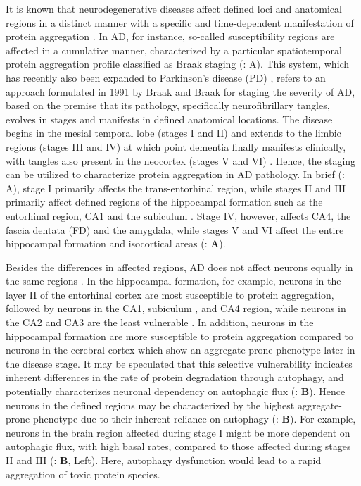 It is known that neurodegenerative diseases affect defined loci and anatomical regions in a distinct manner with a specific and time-dependent manifestation of protein aggregation \citep{Wang2010a,Wang2010b}. In AD, for instance, so-called susceptibility regions are affected in a cumulative manner, characterized by a particular spatiotemporal protein aggregation profile classified as Braak staging (: A). This system, which has recently also been expanded to Parkinson’s disease (PD) \citep{Braak2004}, refers to an approach formulated in 1991 by Braak and Braak for staging the severity of AD, based on the premise that its pathology, specifically neurofibrillary tangles, evolves in stages and manifests in defined anatomical locations. The disease begins in the mesial temporal lobe (stages I and II) and extends to the limbic regions (stages III and IV) at which point dementia finally manifests clinically, with tangles also present in the neocortex (stages V and VI) \citep{Braak1991}. Hence, the staging can be utilized to characterize protein aggregation in AD pathology. In brief (: A), stage I primarily affects the trans-entorhinal region, while stages II and III primarily affect defined regions of the hippocampal formation such as the entorhinal region, CA1 and the subiculum \citep{Braak1991,Braak2012}. Stage IV, however, affects CA4, the fascia dentata (FD) and the amygdala, while stages V and VI affect the entire hippocampal formation and isocortical areas \citep{Braak1991} (: \textbf{A}). 

Besides the differences in affected regions, AD does not affect neurons equally in the same regions \citep{Wang2010a,Wang2010b}. In the hippocampal formation, for example, neurons in the layer II of the entorhinal cortex are most susceptible to protein aggregation, followed by neurons in the CA1, subiculum \citep{Wang2010a,Wang2010b}, and CA4 region, while neurons in the CA2 and CA3 are the least vulnerable \citep{Schonheit2004,Wang2010a,Wang2010b}. In addition, neurons in the hippocampal formation are more susceptible to protein aggregation compared to neurons in the cerebral cortex which show an aggregate-prone phenotype later in the disease stage. It may be speculated that this selective vulnerability indicates inherent differences in the rate of protein degradation through autophagy, and potentially characterizes neuronal dependency on autophagic flux (: \textbf{B}). Hence neurons in the defined regions may be characterized by the highest aggregate-prone phenotype due to their inherent reliance on autophagy (: \textbf{B}). For example, neurons in the brain region affected during stage I might be more dependent on autophagic flux, with high basal rates, compared to those affected during stages II and III (: \textbf{B}, Left). Here, autophagy dysfunction would lead to a rapid aggregation of toxic protein species. 

